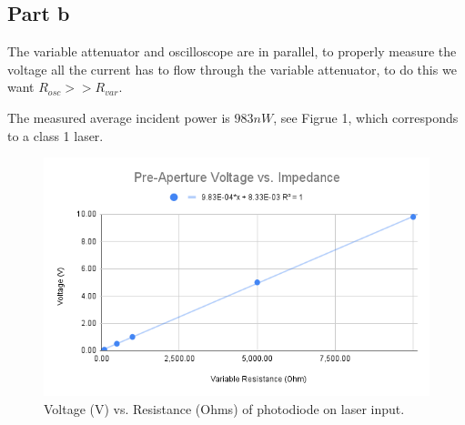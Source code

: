 
\subsection*{Part b}
The variable attenuator and oscilloscope are in parallel, to properly measure the voltage all the current has to flow through the variable attenuator, to do this we want $R_{osc} >> R_{var}$.

The measured average incident power is $983nW$, see Figrue 1, which corresponds to a class 1 laser.

\begin{figure}[h]
    \centering
    \includegraphics[width=0.75\linewidth]{Resources//180Q//Homework 2/Pre-Aperture Voltage vs. Impedance.png}
    \caption{Voltage (V) vs. Resistance (Ohms) of photodiode on laser input.}
    \label{fig:enter-label}
\end{figure}

\pagebreak
